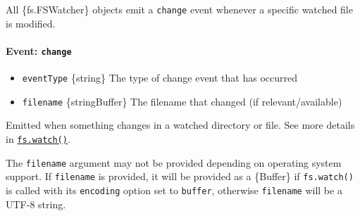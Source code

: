All \{fs.FSWatcher\} objects emit a
\texttt{\textquotesingle{}change\textquotesingle{}} event whenever a
specific watched file is modified.

\paragraph{\texorpdfstring{Event:
\texttt{\textquotesingle{}change\textquotesingle{}}}{Event: \textquotesingle change\textquotesingle{}}}\label{event-change}

\begin{itemize}
\tightlist
\item
  \texttt{eventType} \{string\} The type of change event that has
  occurred
\item
  \texttt{filename} \{string\textbar Buffer\} The filename that changed
  (if relevant/available)
\end{itemize}

Emitted when something changes in a watched directory or file. See more
details in
\hyperref[fswatchfilename-options-listener]{\texttt{fs.watch()}}.

The \texttt{filename} argument may not be provided depending on
operating system support. If \texttt{filename} is provided, it will be
provided as a \{Buffer\} if \texttt{fs.watch()} is called with its
\texttt{encoding} option set to
\texttt{\textquotesingle{}buffer\textquotesingle{}}, otherwise
\texttt{filename} will be a UTF-8 string.

\begin{Shaded}
\begin{Highlighting}[]
 \OperatorTok{;}
\NormalTok{(}\OperatorTok{,}\NormalTok{ \{ }\OperatorTok{:} \NormalTok{ \}}\OperatorTok{,}\OperatorTok{,}\KeywordTok{=\textgreater{}}\NormalTok{ \{}
    \OperatorTok{;}
\NormalTok{  \}}
\NormalTok{\})}\OperatorTok{;}
\end{Highlighting}
\end{Shaded}

